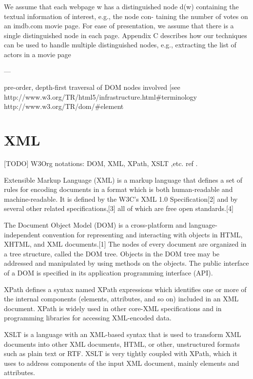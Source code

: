 We assume that each webpage w has a distinguished node d(w) containing the textual information of interest, e.g., the node con- taining the number of votes on an imdb.com movie page. For ease of presentation, we assume that there is a single distinguished node in each page. Appendix C describes how our techniques can be used to handle multiple distinguished nodes, e.g., extracting the list of actors in a movie page

---

pre-order, depth-first traversal of DOM nodes involved [see 
http://www.w3.org/TR/html5/infrastructure.html\#terminology
http://www.w3.org/TR/dom/\#element


\section{XML}

[TODO] W3Org notations: DOM, XML, XPath, XSLT ,etc. ref \cite{Myllymaki02robustweb}.

Extensible Markup Language (XML) is a markup language that defines a set of rules for encoding documents in a format which is both human-readable and machine-readable. It is defined by the W3C's XML 1.0 Specification[2] and by several other related specifications,[3] all of which are free open standards.[4]

The Document Object Model (DOM) is a cross-platform and language-independent convention for representing and interacting with objects in HTML, XHTML, and XML documents.[1] The nodes of every document are organized in a tree structure, called the DOM tree. Objects in the DOM tree may be addressed and manipulated by using methods on the objects. The public interface of a DOM is specified in its application programming interface (API).

XPath defines a syntax named XPath expressions which identifies one or more of the internal components (elements, attributes, and so on) included in an XML document. XPath is widely used in other core-XML specifications and in programming libraries for accessing XML-encoded data.

XSLT is a language with an XML-based syntax that is used to transform XML documents into other XML documents, HTML, or other, unstructured formats such as plain text or RTF. XSLT is very tightly coupled with XPath, which it uses to address components of the input XML document, mainly elements and attributes.


